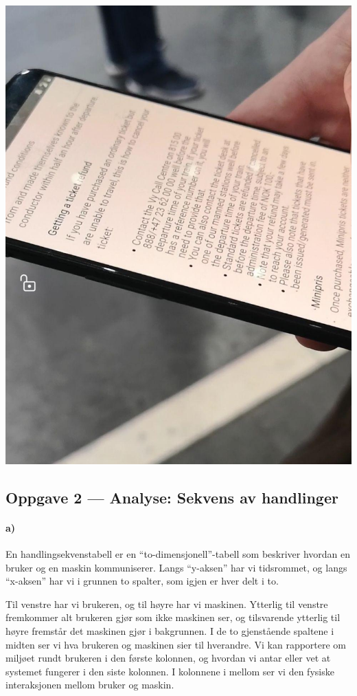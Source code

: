 \documentclass{../../myassignment}
\begin{document}
	\includegraphics[scale=0.25]{pictures2/refundconditions.jpg}

	\newpage

	\subsection*{Oppgave 2 --- Analyse: Sekvens av handlinger}
	\paragraph*{a)}
	En handlingsekvenstabell er en ``to-dimensjonell''-tabell som beskriver hvordan en bruker og en maskin kommuniserer. Langs ``y-aksen'' har vi tidsrommet, og langs ``x-aksen'' har vi i grunnen to spalter, som igjen er hver delt i to.

	Til venstre har vi brukeren, og til h{\o}yre har vi maskinen. Ytterlig til venstre fremkommer alt brukeren gj{\o}r som ikke maskinen ser, og tilsvarende ytterlig til h{\o}yre fremst{\aa}r det maskinen gj{\o}r i bakgrunnen. I de to gjenst{\aa}ende spaltene i midten ser vi hva brukeren og maskinen sier til hverandre. Vi kan rapportere om miljøet rundt brukeren i den første kolonnen, og hvordan vi antar eller vet at systemet fungerer i den siste kolonnen. I kolonnene i mellom ser vi den fysiske interaksjonen mellom bruker og maskin.
\end{document}
